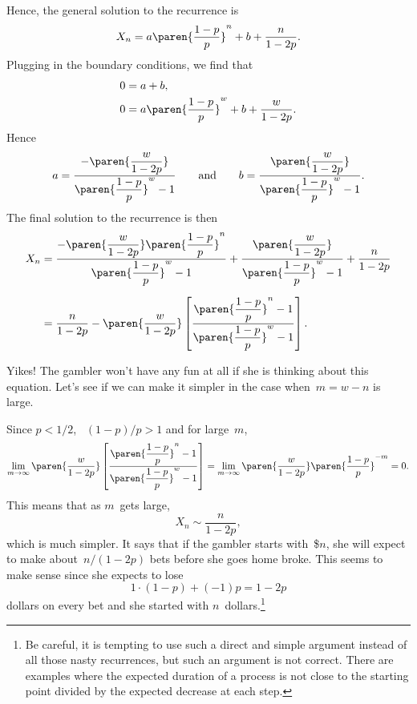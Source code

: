 Hence, the general solution to the recurrence is
\begin{equation*}
    X_n = a \paren{\frac{1 - p}{p}}^n + b + \frac{n}{1 - 2p}.
\end{equation*}
Plugging in the boundary conditions, we find that
\begin{align*}
    0 &= a + b, \\
    0 &= a \paren{\frac{1 - p}{p}}^w + b + \frac{w}{1 - 2p}.
\end{align*}
Hence
\begin{equation*}
a = \frac{\displaystyle - \paren{\frac{w}{1 - 2p}}}
         {\displaystyle \paren{\frac{1 - p}{p}}^w - 1}
\qquad
\text{and}
\qquad
b = \frac{\displaystyle \paren{\frac{w}{1 - 2p}}}
         {\displaystyle \paren{\frac{1 - p}{p}}^w - 1}.
\end{equation*}
The final solution to the recurrence is then
\begin{align*}
X_n &= \frac{\displaystyle - \paren{\frac{w}{1 - 2p}} \paren{\frac{1 - p}{p}}^n }
           {\displaystyle \paren{\frac{1 - p}{p}}^w - 1}
 + \frac{\displaystyle \paren{\frac{w}{1 - 2p}}}
         {\displaystyle \paren{\frac{1 - p}{p}}^w - 1}
+ \frac{n}{1 - 2p} \\[2\jot]
    &= \frac{n}{1 - 2p} -
        \paren{\frac{w}{1 - 2p}}
        \left[
            \frac{\displaystyle\paren{\frac{1 - p}{p}}^n - 1}
                 {\displaystyle\paren{\frac{1 - p}{p}}^w - 1}
        \right].
\end{align*}

Yikes!  The gambler won't have any fun at all if she is thinking about
this equation.  Let's see if we can make it simpler in the case
when~$m = w - n$ is large.

Since $p < 1/2$, \ $(1 - p)/p > 1$ and for large~$m$,
\begin{equation*}
\lim_{m \to \infty} \paren{\frac{w}{1 - 2p}}
    \left[
        \frac{\displaystyle\paren{\frac{1 - p}{p}}^n - 1}
             {\displaystyle\paren{\frac{1 - p}{p}}^w - 1}
    \right]
    = \lim_{m \to \infty} \paren{\frac{w}{1 - 2p}}
        \paren{\frac{1 - p}{p}}^{-m} = 0.
\end{equation*}
This means that as $m$~gets large,
\begin{equation*}
    X_n \sim \frac{n}{1 - 2p},
\end{equation*}
which is much simpler.  It says that if the gambler starts with~\$$n$,
she will expect to make about~$n/(1 - 2p)$ bets before she goes home
broke.  This seems to make sense since she expects to lose
\begin{equation*}
    1 \cdot (1 - p) + (-1) p = 1 - 2p
\end{equation*}
dollars on every bet and she started with $n$~dollars.\footnote{Be
  careful, it is tempting to use such a direct and simple argument
  instead of all those nasty recurrences, but such an argument is not
  correct.  There are examples where the expected duration of a
  process is not close to the starting point divided by the expected
  decrease at each step.}

